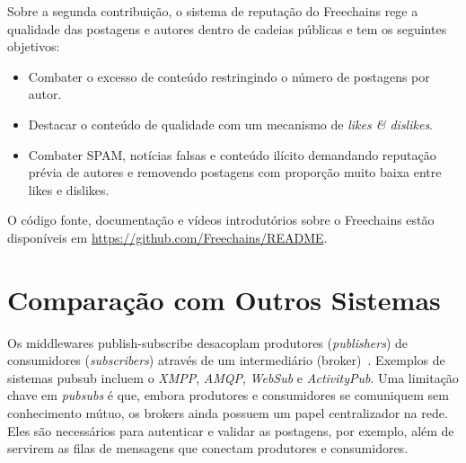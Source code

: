 \documentclass[12pt]{article}
\newcommand{\FC} {Freechains\xspace}
\begin{document}
%
Sobre a segunda contribuição, o sistema de reputação do \FC rege a qualidade
das postagens e autores dentro de cadeias públicas e tem os seguintes
objetivos:
%
\begin{itemize}
\item Combater o excesso de conteúdo restringindo o número de postagens por autor.
\item Destacar o conteúdo de qualidade com um mecanismo de \emph{likes \& dislikes}.
\item Combater SPAM, notícias falsas e conteúdo ilícito demandando reputação
      prévia de autores e removendo postagens com proporção muito baixa entre
      likes e dislikes.
\end{itemize}
%
O código fonte, documentação e vídeos introdutórios sobre o \FC estão
disponíveis em \url{https://github.com/Freechains/README}.


\section{Comparação com Outros Sistemas}
\label{sec.related}



Os middlewares publish-subscribe desacoplam produtores (\emph{publishers}) de
consumidores (\emph{subscribers}) através de um intermediário
(broker)~\cite{TODO}.
Exemplos de sistemas pubsub incluem o \emph{XMPP}, \emph{AMQP}, \emph{WebSub} e
\emph{ActivityPub}.
Uma limitação chave em \emph{pubsubs} é que, embora produtores e consumidores
se comuniquem sem conhecimento mútuo, os brokers ainda possuem um papel
centralizador na rede.
Eles são necessários para autenticar e validar as postagens, por exemplo, além
de servirem as filas de mensagens que conectam produtores e consumidores.
\end{document}
